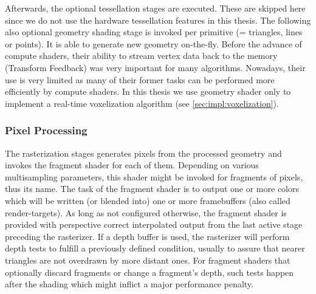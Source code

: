 \documentclass[thesis.tex]{subfiles}
\begin{document}
Afterwards, the optional tessellation stages are executed.
These are skipped here since we do not use the hardware tessellation features in this thesis.
The following also optional geometry shading stage is invoked per primitive (= triangles, lines or points).
It is able to generate new geometry on-the-fly.
Before the advance of compute shaders, their ability to stream vertex data back to the memory (Transform Feedback) was very important for many algorithms.
Nowadays, their use is very limited as many of their former tasks can be performed more efficiently by compute shaders.
In this thesis we use geometry shader only to implement a real-time voxelization algorithm (see \autoref{sec:impl:voxelization}).


\subsubsection{Pixel Processing}
The rasterization stages generates pixels from the processed geometry and invokes the fragment shader for each of them.
Depending on various multisampling parameters, this shader might be invoked for fragments of pixels, thus its name.
The task of the fragment shader is to output one or more colors which will be written (or blended into) one or more framebuffers (also called render-targets).
As long as not configured otherwise, the fragment shader is provided with perspective correct interpolated output from the last active stage preceding the rasterizer.
If a depth buffer is used, the rasterizer will perform depth tests to fulfill a previously defined condition, usually to assure that nearer triangles are not overdrawn by more distant ones.
For fragment shaders that optionally discard fragments or change a fragment's depth, such tests happen after the shading which might inflict a major performance penalty.
\end{document}
